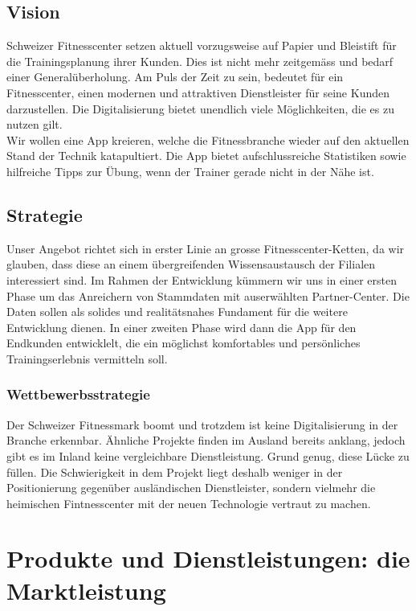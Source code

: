 \subsection{Vision}
Schweizer Fitnesscenter setzen aktuell vorzugsweise auf Papier und Bleistift für die Trainingsplanung ihrer Kunden. Dies ist nicht mehr zeitgemäss und bedarf einer Generalüberholung. Am Puls der Zeit zu sein, bedeutet für ein Fitnesscenter, einen modernen und attraktiven Dienstleister für seine Kunden darzustellen. Die Digitalisierung bietet unendlich viele Möglichkeiten, die es zu nutzen gilt. \\
Wir wollen eine App kreieren, welche die Fitnessbranche wieder auf den aktuellen Stand der Technik katapultiert. Die App bietet aufschlussreiche Statistiken sowie hilfreiche Tipps zur Übung, wenn der Trainer gerade nicht in der Nähe ist.

\subsection{Strategie}
Unser Angebot richtet sich in erster Linie an grosse Fitnesscenter-Ketten, da wir glauben, dass diese an einem übergreifenden Wissensaustausch der Filialen interessiert sind. Im Rahmen der Entwicklung kümmern wir uns in einer ersten Phase um das Anreichern von Stammdaten mit auserwählten Partner-Center. Die Daten sollen als solides und realitätsnahes Fundament für die weitere Entwicklung dienen. In einer zweiten Phase wird dann die App für den Endkunden entwicklelt, die ein möglichst komfortables und persönliches Trainingserlebnis vermitteln soll. 

\subsubsection{Wettbewerbsstrategie}
Der Schweizer Fitnessmark boomt und trotzdem ist keine Digitalisierung in der Branche erkennbar. Ähnliche Projekte finden im Ausland bereits anklang, jedoch gibt es im Inland keine vergleichbare Dienstleistung. Grund genug, diese Lücke zu füllen. Die Schwierigkeit in dem Projekt liegt deshalb weniger in der Positionierung gegenüber ausländischen Dienstleister, sondern vielmehr die heimischen Fintnesscenter mit der neuen Technologie vertraut zu machen.


\section{Produkte und Dienstleistungen: die Marktleistung}

